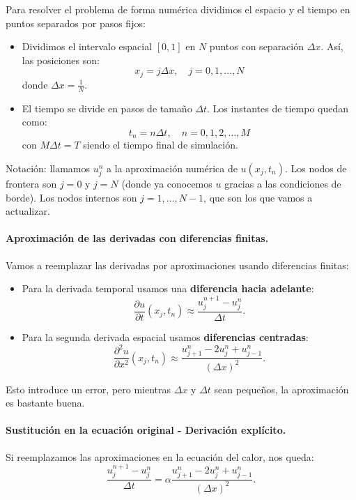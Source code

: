 \documentclass[12pt,a4paper]{article}
\begin{document}
Para resolver el problema de forma numérica dividimos el espacio y el tiempo en puntos separados por pasos fijos:
\begin{itemize}
    \item Dividimos el intervalo espacial $[0,1]$ en $N$ puntos con separación $\Delta x$. Así, las posiciones son:
    \[
    x_j = j\Delta x, \quad j = 0,1,\dots,N
    \]
    donde $\Delta x = \frac{1}{N}$.
    \item El tiempo se divide en pasos de tamaño $\Delta t$. Los instantes de tiempo quedan como:
    \[
    t_n = n\Delta t, \quad n = 0,1,2,\dots,M
    \]
    con $M\Delta t = T$ siendo el tiempo final de simulación.
\end{itemize}

Notación: llamamos $u_j^n$ a la aproximación numérica de $u(x_j,t_n)$.  
Los nodos de frontera son $j=0$ y $j=N$ (donde ya conocemos $u$ gracias a las condiciones de borde). Los nodos internos son $j=1,\dots,N-1$, que son los que vamos a actualizar.

\paragraph{Aproximación de las derivadas con diferencias finitas.}

Vamos a reemplazar las derivadas por aproximaciones usando diferencias finitas:
\begin{itemize}
    \item Para la derivada temporal usamos una \textbf{diferencia hacia adelante}:
    \[
    \frac{\partial u}{\partial t}(x_j,t_n) \approx \frac{u_j^{n+1}-u_j^n}{\Delta t}.
    \]
    \item Para la segunda derivada espacial usamos \textbf{diferencias centradas}:
    \[
    \frac{\partial^2 u}{\partial x^2}(x_j,t_n) \approx \frac{u_{j+1}^n - 2u_j^n + u_{j-1}^n}{(\Delta x)^2}.
    \]
\end{itemize}

Esto introduce un error, pero mientras $\Delta x$ y $\Delta t$ sean pequeños, la aproximación es bastante buena.

\paragraph{Sustitución en la ecuación original - Derivación explícito.}

Si reemplazamos las aproximaciones en la ecuación del calor, nos queda:
\[
\frac{u_j^{n+1}-u_j^n}{\Delta t} = \alpha \frac{u_{j+1}^n - 2u_j^n + u_{j-1}^n}{(\Delta x)^2}.
\]
\end{document}
